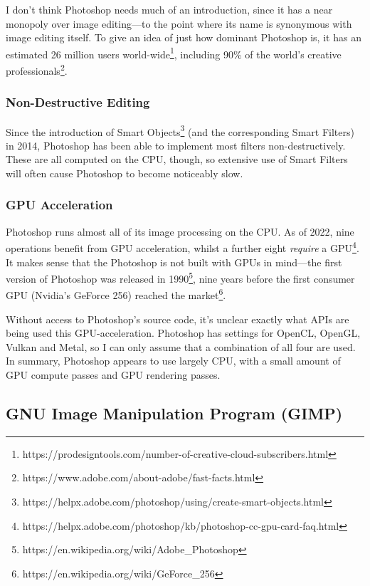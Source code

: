\documentclass[12pt]{article}
\begin{document}
I don't think Photoshop needs much of an introduction, since it has a near monopoly over image
editing---to the point where its name is synonymous with image editing itself.  To give an idea of
just how dominant Photoshop is, it has an estimated 26 million users
world-wide\footnote{https://prodesigntools.com/number-of-creative-cloud-subscribers.html}, including
90\% of the world's creative
professionals\footnote{https://www.adobe.com/about-adobe/fast-facts.html}.

\subsubsection{Non-Destructive Editing}

Since the introduction of Smart
Objects\footnote{https://helpx.adobe.com/photoshop/using/create-smart-objects.html} (and the
corresponding Smart Filters) in 2014, Photoshop has been able to implement most filters
non-destructively.  These are all computed on the CPU, though, so extensive use of Smart Filters
will often cause Photoshop to become noticeably slow.

\subsubsection{GPU Acceleration}

Photoshop runs almost all of its image processing on the CPU.  As of 2022, nine operations benefit
from GPU acceleration, whilst a further eight \emph{require} a
GPU\footnote{https://helpx.adobe.com/photoshop/kb/photoshop-cc-gpu-card-faq.html}.  It makes sense
that the Photoshop is not built with GPUs in mind---the first version of Photoshop was released in
1990\footnote{https://en.wikipedia.org/wiki/Adobe\_Photoshop}, nine years before the first consumer
GPU (Nvidia's GeForce 256) reached the market\footnote{https://en.wikipedia.org/wiki/GeForce\_256}.

Without access to Photoshop's source code, it's unclear exactly what APIs are being used this
GPU-acceleration.  Photoshop has settings for OpenCL, OpenGL, Vulkan and Metal, so I can only assume
that a combination of all four are used.  In summary, Photoshop appears to use largely CPU, with a
small amount of GPU compute passes and GPU rendering passes.

\subsection{GNU Image Manipulation Program (GIMP)}
\end{document}
